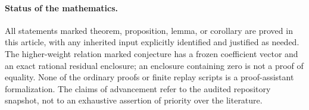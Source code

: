 \paragraph{Status of the mathematics.}
All statements marked theorem, proposition, lemma, or corollary are
proved in this article, with any inherited input explicitly identified
and justified as needed. The higher-weight relation marked conjecture
has a frozen coefficient vector and an exact rational residual enclosure;
an enclosure containing zero is not a proof of equality. None of the
ordinary proofs or finite replay scripts is a proof-assistant
formalization. The claims of advancement refer to the audited repository
snapshot, not to an exhaustive assertion of priority over the literature.

